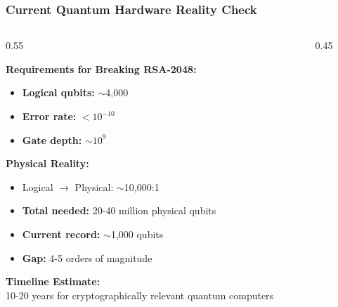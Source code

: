 \documentclass[aspectratio=169,10pt]{beamer}
\newcommand{\slideheader}[1]{\frametitle{#1}}
\theoremstyle{plain}
\begin{document}
\begin{frame}
  \slideheader{Current Quantum Hardware Reality Check}
  
  \begin{columns}[T]
    \begin{column}{0.55\textwidth}

    \textbf{Requirements for Breaking RSA-2048:}
    
    \begin{itemize}
      \item \textbf{Logical qubits:} $\sim$4,000
      \item \textbf{Error rate:} $< 10^{-10}$
      \item \textbf{Gate depth:} $\sim 10^9$
    \end{itemize}
    
    \vspace{0.3cm}
    
    \textbf{Physical Reality:}
    
    \begin{itemize}
      \item Logical $\rightarrow$ Physical: $\sim$10,000:1
      \item \textbf{Total needed:} 20-40 million physical qubits
      \item \textbf{Current record:} $\sim$1,000 qubits
      \item \textbf{Gap:} 4-5 orders of magnitude
    \end{itemize}
    
    \vspace{0.3cm}
    
    \begin{blueBox}
      \textbf{Timeline Estimate:}\\
      10-20 years for cryptographically relevant quantum computers
    \end{blueBox}
  
    \end{column}
    \begin{column}{0.45\textwidth}

\end{column}
\end{columns}
\end{frame}
\end{document}
